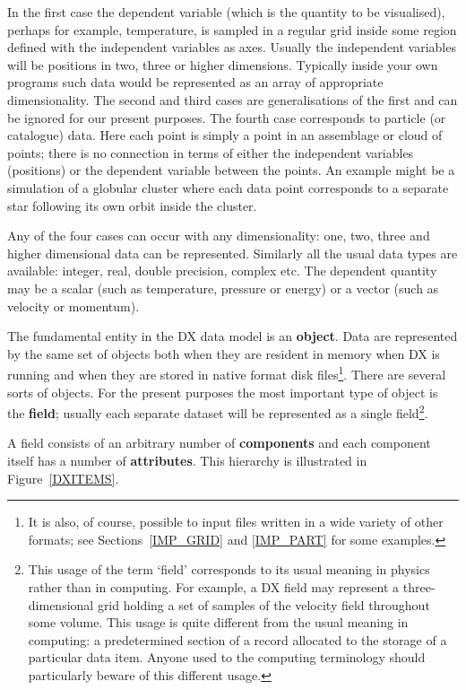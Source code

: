In the first case the dependent variable (which is the quantity to be
visualised), perhaps for example, temperature, is sampled in a regular
grid inside some region defined with the independent variables as axes.
Usually the independent variables will be positions in two, three or
higher dimensions. Typically inside your own programs such data would be
represented as an array of appropriate dimensionality. The second and third
cases are generalisations of the first and can be ignored for our present
purposes. The fourth case corresponds to particle (or catalogue) data.
Here each point is simply a point in an assemblage or cloud of points;
there is no connection in terms of either the independent variables
(positions) or the dependent variable between the points. An example
might be a simulation of a globular cluster where each data point
corresponds to a separate star following its own orbit inside the
cluster.

Any of the four cases can occur with any dimensionality: one, two,
three and higher dimensional data can be represented. Similarly all
the usual data types are available: integer, real, double precision,
complex etc. The dependent quantity may be a scalar (such as temperature,
pressure or energy) or a vector (such as velocity or momentum).

The fundamental entity in the DX data model is an {\bf object}. Data
are represented by the same set of objects both when they are resident
in memory when DX is running and when they are stored in native format
disk files\footnote{It is also, of course, possible to input files
written in a wide variety of other formats; see Sections~\ref{IMP_GRID}
and \ref{IMP_PART} for some examples.}. There are several sorts of objects.
For the present purposes the most important type of object is the {\bf
field}; usually each separate dataset will be represented as a single
field\footnote{This usage of the term `field' corresponds to its usual
meaning in physics rather than in computing. For example, a DX field may
represent a three-dimensional grid holding a set of samples of the
velocity field throughout some volume. This usage is quite different from
the usual meaning in computing: a predetermined section of a record
allocated to the storage of a particular data item. Anyone used to the
computing terminology should particularly beware of this different
usage.}.

A field consists of an arbitrary number of {\bf components} and each
component itself has a number of {\bf attributes}. This hierarchy is
illustrated in Figure~\ref{DXITEMS}.

